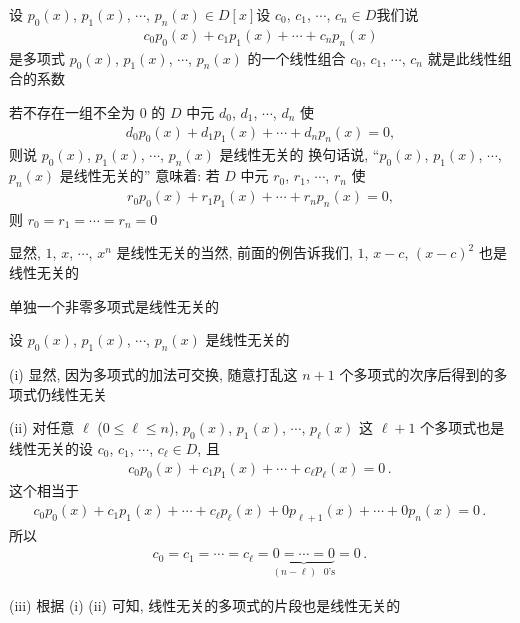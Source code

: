 \begin{definition}
    设 $p_0 (x)$, $p_1 (x)$, $\cdots$, $p_n (x) \in D[x]$\period 设 $c_0$, $c_1$, $\cdots$, $c_n \in D$\period 我们说
    \begin{align*}
        c_0 p_0 (x) + c_1 p_1 (x) + \cdots + c_n p_n (x)
    \end{align*}
    是多项式 $p_0 (x)$, $p_1 (x)$, $\cdots$, $p_n (x)$ 的一个线性组合 \period $c_0$, $c_1$, $\cdots$, $c_n$ 就是此线性组合的系数\period

    若不存在一组不全为 $0$ 的 $D$ 中元 $d_0$, $d_1$, $\cdots$, $d_n$ 使
    \begin{align*}
        d_0 p_0 (x) + d_1 p_1 (x) + \cdots + d_n p_n (x) = 0,
    \end{align*}
    则说 $p_0 (x)$, $p_1 (x)$, $\cdots$, $p_n (x)$ 是线性无关的 \period 换句话说, ``$p_0 (x)$, $p_1 (x)$, $\cdots$, $p_n (x)$ 是线性无关的'' 意味着: 若 $D$ 中元 $r_0$, $r_1$, $\cdots$, $r_n$ 使
    \begin{align*}
        r_0 p_0 (x) + r_1 p_1 (x) + \cdots + r_n p_n (x) = 0,
    \end{align*}
    则 $r_0 = r_1 = \cdots = r_n = 0$\period
\end{definition}

\begin{example}
    显然, $1$, $x$, $\cdots$, $x^n$ 是线性无关的\period 当然, 前面的例告诉我们, $1$, $x-c$, $(x-c)^2$ 也是线性无关的\period
\end{example}

\begin{example}
    单独一个非零多项式是线性无关的\period
\end{example}

\begin{remark}
    设 $p_0 (x)$, $p_1 (x)$, $\cdots$, $p_n (x)$ 是线性无关的\period

    (i) 显然, 因为多项式的加法可交换, 随意打乱这 $n+1$ 个多项式的次序后得到的多项式仍线性无关\period

    (ii) 对任意 $\ell$ ($0 \leq \ell \leq n$), $p_0 (x)$, $p_1 (x)$, $\cdots$, $p_{\ell} (x)$ 这 $\ell + 1$ 个多项式也是线性无关的\period 设 $c_0$, $c_1$, $\cdots$, $c_\ell \in D$, 且
    \begin{align*}
        c_0 p_0 (x) + c_1 p_1 (x) + \cdots + c_\ell p_\ell (x) = 0 \period
    \end{align*}
    这个相当于
    \begin{align*}
        c_0 p_0 (x) + c_1 p_1 (x) + \cdots + c_\ell p_\ell (x) + 0 p_{\ell+1} (x) + \cdots + 0 p_n (x) = 0 \period
    \end{align*}
    所以
    \begin{align*}
        c_0 = c_1 = \cdots = c_\ell = \underbrace{0 = \cdots = 0}_{(n - \ell)\text{ $0$'s}} = 0 \period
    \end{align*}

    (iii) 根据 (i) (ii) 可知, 线性无关的多项式的片段也是线性无关的\period
\end{remark}

